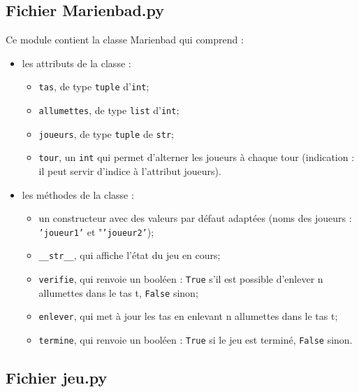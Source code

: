 \documentclass[a4paper,12pt,firamath,article]{nsi}
\begin{document}
\subsection*{Fichier Marienbad.py}
Ce module contient la classe Marienbad qui comprend :
\begin{itemize}
	\item 	les attributs de la classe :
			\begin{itemize}
				\item 	\texttt{tas}, de type \texttt{tuple} d’\texttt{int};
				\item \texttt{allumettes}, de type \texttt{list} d’\texttt{int};
				\item \texttt{joueurs}, de type \texttt{tuple} de \texttt{str};
				\item \texttt{tour}, un \texttt{int} qui permet d’alterner les joueurs à chaque tour (indication : il peut servir d’indice à l’attribut joueurs).
			\end{itemize}
	\item 	les méthodes de la classe :
		\begin{itemize}
			\item 	un constructeur avec des valeurs par défaut adaptées (noms des joueurs : \texttt{'joueur1'} et "\texttt{'joueur2'});
			\item 	\texttt{__str__}, qui affiche l’état du jeu en cours;
			\item 	\texttt{verifie}, qui renvoie un booléen : \texttt{True} s’il est possible d’enlever n allumettes dans le tas t, \texttt{False} sinon;
			\item 	\texttt{enlever}, qui met à jour les tas en enlevant n allumettes dans le tas t;
			\item 	\texttt{termine}, qui renvoie un booléen : \texttt{True} si le jeu est terminé, \texttt{False} sinon.
		\end{itemize}
\end{itemize}

\subsection*{Fichier jeu.py}
\end{document}
